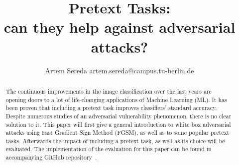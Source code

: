 \documentclass[12pt]{extarticle}
\title{
    Pretext Tasks: \\
    can they help against adversarial attacks?
}
\author{Artem Sereda artem.sereda@campus.tu-berlin.de}
\begin{document}
    \maketitle

    \begin{abstract}
    The continuous improvements in the image classification over the last years are opening doors to
    a lot of life-changing applications of Machine Learning (ML).
    It has been proven that including a pretext task improves classifiers' standard accuracy.
    Despite numerous studies of an adversarial vulnerability phenomenon, there is no clear solution to it.
    This paper will first give a general introduction to white box adversarial attacks using Fast Gradient Sign Method (FGSM),
    as well as to some popular pretext tasks.
    Afterwards the impact of including a pretext task, as well as its choice will be evaluated.
    The implementation of the evaluation for this paper can be found in accompanying GitHub repository~\cite{github}.
    \end{abstract}


    
    
    


    \printbibliography
\end{document}
